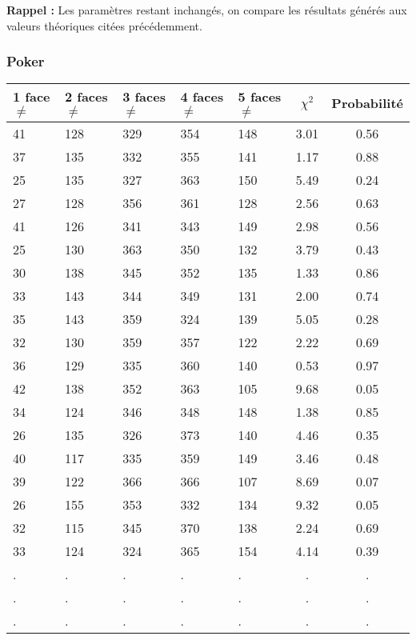 \documentclass[12pt,a4paper]{article}
\begin{document}
\textbf{Rappel :} Les paramètres restant inchangés, on compare
les résultats générés aux valeurs théoriques citées précédemment.
\subsubsection{Poker}

\begin{center}
\begin{tabular}{|l|l|l|l|l|c|c|}
\hline
1 face $\neq$ & 2 faces $\neq$  & 3 faces $\neq$ & 4 faces $\neq$ & 5 faces $\neq$ & $\chi^2$ & Probabilité \\
\hline \hline
41 & 128 & 329 & 354 & 148 &  3.01 &  0.56\\ \hline
37 & 135 & 332 & 355 & 141 &  1.17 &  0.88\\ \hline
25 & 135 & 327 & 363 & 150 &  5.49 &  0.24\\ \hline
27 & 128 & 356 & 361 & 128 &  2.56 &  0.63\\ \hline
41 & 126 & 341 & 343 & 149 &  2.98 &  0.56\\ \hline
25 & 130 & 363 & 350 & 132 &  3.79 &  0.43\\ \hline
30 & 138 & 345 & 352 & 135 &  1.33 &  0.86\\ \hline
33 & 143 & 344 & 349 & 131 &  2.00 &  0.74\\ \hline
35 & 143 & 359 & 324 & 139 &  5.05 &  0.28\\ \hline
32 & 130 & 359 & 357 & 122 &  2.22 &  0.69\\ \hline
36 & 129 & 335 & 360 & 140 &  0.53 &  0.97\\ \hline
42 & 138 & 352 & 363 & 105 &  9.68 &  0.05\\ \hline
34 & 124 & 346 & 348 & 148 &  1.38 &  0.85\\ \hline
26 & 135 & 326 & 373 & 140 &  4.46 &  0.35\\ \hline
40 & 117 & 335 & 359 & 149 &  3.46 &  0.48\\ \hline
39 & 122 & 366 & 366 & 107 &  8.69 &  0.07\\ \hline
26 & 155 & 353 & 332 & 134 &  9.32 &  0.05\\ \hline
32 & 115 & 345 & 370 & 138 &  2.24 &  0.69\\ \hline
33 & 124 & 324 & 365 & 154 &  4.14 &  0.39\\ \hline
 . & . & . & . & . & . & . \\ \hline
 . & . & . & . & . & . & . \\ \hline
 . & . & . & . & . & . & . \\ \hline

\end{tabular}
\end{center}
\end{document}
